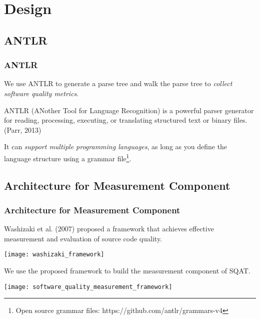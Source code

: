\section{Design}

\subsection{ANTLR}
\begin{frame}
\frametitle{ANTLR}

We use ANTLR to generate a parse tree and walk the parse tree to \emph{collect software quality metrics}.

\begin{definition}
ANTLR (ANother Tool for Language Recognition) is a powerful parser generator for reading, processing, executing, or translating structured text or binary files. (Parr, 2013)
\end{definition}

It can \emph{support multiple programming languages}, as long as you define the language structure using a grammar file\footnote{Open source grammar files: https://github.com/antlr/grammars-v4}.

\end{frame}

\subsection{Architecture for Measurement Component}
\begin{frame}[allowframebreaks]
\frametitle{Architecture for Measurement Component}
Washizaki et al. (2007) proposed a framework that achieves effective measurement and evaluation of source code quality.

\texttt{[image: washizaki\_framework]}

\framebreak

We use the proposed framework to build the measurement component of SQAT.

\texttt{[image: software\_quality\_measurement\_framework]}
\end{frame}

